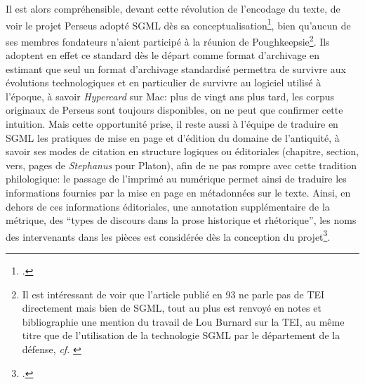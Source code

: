 Il est alors compréhensible, devant cette révolution de l'encodage du texte, de voir le projet Perseus adopté SGML dès sa conceptualisation\footcite[p. 138]{mylonas_perseus_1993}, bien qu'aucun de ses membres fondateurs n'aient participé à la réunion de Poughkeepsie\footnote{Il est intéressant de voir que l'article publié en 93 ne parle pas de TEI directement mais bien de SGML, tout au plus est renvoyé en notes et bibliographie une mention du travail de Lou Burnard sur la TEI, au même titre que de l'utilisation de la technologie SGML par le département de la défense, \textit{cf.} \cite[notes 8 et 9, p.~155]{mylonas_perseus_1993}}. Ils adoptent en effet ce standard dès le départ comme format d'archivage en estimant que seul un format d'archivage standardisé permettra de survivre aux évolutions technologiques et en particulier de survivre au logiciel utilisé à l'époque, à savoir \textit{Hypercard} sur Mac: plus de vingt ans plus tard, les corpus originaux de Perseus sont toujours disponibles, on ne peut que confirmer cette intuition. Mais cette opportunité prise, il reste aussi à l'équipe de traduire en SGML les pratiques de mise en page et d'édition du domaine de l'antiquité, à savoir ses modes de citation en structure logiques ou éditoriales (chapitre, section, vers, pages de \textit{Stephanus} pour Platon), afin de ne pas rompre avec cette tradition philologique: le passage de l'imprimé au numérique permet ainsi de traduire les informations fournies par la mise en page en métadonnées sur le texte. Ainsi, en dehors de ces informations éditoriales, une annotation supplémentaire de la métrique, des \enquote{types de discours dans la prose historique et rhétorique}, les noms des intervenants dans les pièces est considérée dès la conception du projet\footcite[p. 137]{mylonas_perseus_1993}.

